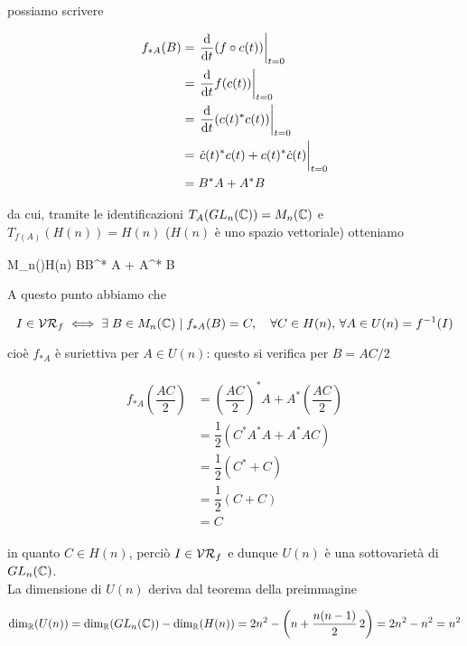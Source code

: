 possiamo scrivere

\begin{align}
	\begin{split}
		f_{*A}(B) &= \eval{ \dv{t} (f \circ c(t)) }_{t=0} \\
		&= \eval{ \dv{t} f(c(t)) }_{t=0} \\
		&= \eval{ \dv{t} (c(t)^{*} c(t)) }_{t=0} \\
		&= \eval{ \dot{c}(t)^{*} c(t) + c(t)^{*} \dot{c}(t) }_{t=0} \\
		&= B^{*} A + A^{*} B
	\end{split}
\end{align}

da cui, tramite le identificazioni $ T_{A}(GL_{n}(\mathbb{C})) = M_{n}(\mathbb{C}) $ e $ T_{f(A)}(H(n)) = H(n) $ ($ H(n) $ è uno spazio vettoriale) otteniamo

	{M_{n}(\C)}{H(n)}
	{B}{B^{*} A + A^{*} B}

A questo punto abbiamo che

\begin{equation}
	I \in \VR_{f} \iff \E B \in M_{n}(\C) \mid f_{*A}(B) = C %
	\qcomma \forall C \in H(n), \, \forall A \in U(n) = f^{-1}(I)
\end{equation}

cioè $ f_{*A} $ è suriettiva per $ A \in U(n) $: questo si verifica per $ B = AC/2 $

\begin{align}
	\begin{split}
		f_{*A} \left( \dfrac{A C}{2} \right) &= \left( \dfrac{A C}{2} \right)^{*} A + A^{*} \left( \dfrac{A C}{2} \right) \\
		&= \dfrac{1}{2} (C^{*} A^{*} A + A^{*} A C) \\
		&= \dfrac{1}{2} (C^{*} + C) \\
		&= \dfrac{1}{2} (C + C) \\
		&= C
	\end{split}
\end{align}

in quanto $ C \in H(n) $, perciò $ I \in \mathcal{VR}_{f} $ e dunque $ U(n) $ è una sottovarietà di $ GL_{n}(\mathbb{C}) $.\\
La dimensione di $ U(n) $ deriva dal teorema della preimmagine

\begin{equation}
	\dim_{\R}(U(n)) = \dim_{\R}(GL_{n}(\C)) - \dim_{\R}(H(n)) %
	= 2 n^{2} - \left( n +\dfrac{n (n-1)}{2} \, 2 \right) %
	= 2 n^{2} - n^{2} %
	= n^{2}
\end{equation}

